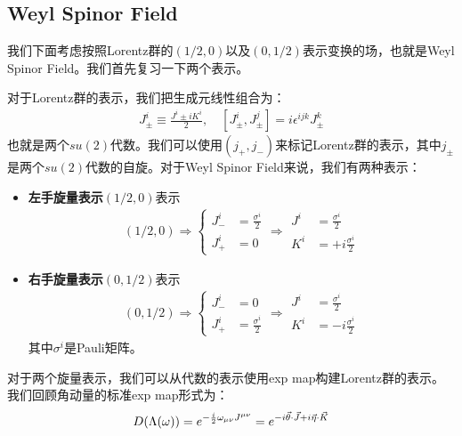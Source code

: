 \subsection{Weyl Spinor Field}

我们下面考虑按照Lorentz群的$ (1/2,0) $以及$ (0,1/2) $表示变换的场，也就是Weyl Spinor
Field。我们首先复习一下两个表示。

\bigskip
{}

对于Lorentz群的表示，我们把生成元线性组合为：
\begin{align}
  J_\pm^i\equiv\frac{J^i\pm
  iK^i}{2},\quad[J_\pm^i,J_\pm^j]=i\epsilon^{ijk}J_\pm^k
\end{align}
也就是两个$ su(2) $代数。我们可以使用$ (j_+,j_-) $来标记Lorentz群的表示，其中$ j_\pm $是两个$
su(2) $代数的自旋。对于Weyl Spinor Field来说，我们有两种表示：
\begin{itemize}
  \item \textbf{左手旋量表示}$ (1/2,0) $表示
    \begin{align}
      \left.(1/2,0)\Rightarrow\left\{
        \begin{array}{ll}J_-^i&=\frac{\sigma^i}{2}\\J_+^i&=0
        \end{array}\right.\right.\Rightarrow\left.
        \begin{array}{ll}J^i&=\frac{\sigma^i}{2}\\K^i&=+i\frac{\sigma^i}{2}
        \end{array}\right.
      \end{align}
    \item \textbf{右手旋量表示}$ (0,1/2) $表示
      \begin{align}
        \left.\left(0,1/2\right)\right.\Rightarrow\left\{
          \begin{array}{ll}J_-^i&=0\\J_+^i&=\frac{\sigma^i}{2}
          \end{array}\right.\Rightarrow
          \begin{array}{ll}J^i&=\frac{\sigma^i}{2}\\K^i&=-i\frac{\sigma^i}{2}
          \end{array}
        \end{align}
        其中$ \sigma^i $是Pauli矩阵。
    \end{itemize}
    对于两个旋量表示，我们可以从代数的表示使用exp map构建Lorentz群的表示。我们回顾角动量的标准exp map形式为：
    \begin{align}
      \large
      D(\Lambda(\omega))=e^{-\frac{i}{2}\omega_{\mu\nu}J^{\mu\nu}}=e^{-i\vec{\theta}\cdot\vec{J}+i\vec{\eta}\cdot\vec{K}}
    \end{align}
